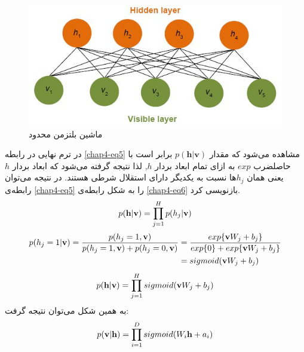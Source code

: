 \begin{figure}[!t]
	\centering
	\includegraphics[scale=0.5]{chap4-img/RBM}
	\caption{ماشین بلتزمن محدود}
	\label{chap4-fig1}
\end{figure}

در ترم نهایی در رابطه
\ref{chap4-eq5}
مشاهده می‌شود که مقدار
$p(\textbf{h}|\textbf{v})$
برابر است با حاصلضرب
$exp$
به ازای تمام ابعاد بردار
$h$,
لذا نتیجه گرفته می‌‌شود که ابعاد بردار
$h$ 
یعنی‌ همان
$h_j$ها
نسبت به یکدیگر دارای استقلال شرطی هستند. در نتیجه می‌توان رابطه‌ی
\ref{chap4-eq5}
را به شکل رابطه‌ی
\ref{chap4-eq6}
بازنویسی کرد.
\begin{align}
	\centering
	\label{chap4-eq6}
	p(\textbf{h}|\textbf{v})=\prod_{j=1}^{H}p(h_j|\textbf{v})	
\end{align}
\begin{align}
	\centering
	\label{chap4-eq7}
	p(h_j = 1|\textbf{v})=\dfrac{p(h_j=1,\textbf{v})}{p(h_j=1,\textbf{v})+ p(h_j=0,\textbf{v})}
						 &=\dfrac{exp\{\textbf{v}W_j + b_j\}}{exp\{0\} + exp\{\textbf{v}W_j + b_j\}}\\\nonumber
						 &=sigmoid(\textbf{v}W_j + b_j)
\end{align}
\begin{align}
	\centering
	\label{chap4-eq8}
	p(\textbf{h}|\textbf{v})=\prod_{j=1}^{H}sigmoid(\textbf{v}W_j + b_j)
\end{align}
به همین شکل می‌‌توان نتیجه گرفت:
\begin{align}
	\centering
	\label{chap4-eq9}
	p(\textbf{v}|\textbf{h})=\prod_{i=1}^{D}sigmoid(W_i\textbf{h} + a_i)
\end{align}

